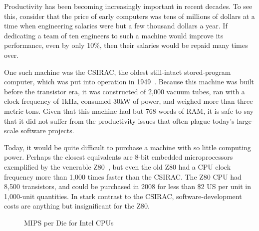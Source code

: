 Productivity has been becoming increasingly important in recent decades.
To see this, consider that the price of early computers was tens
of millions of dollars at
a time when engineering salaries were but a few thousand dollars a year.
If dedicating a team of ten engineers to such a machine would improve
its performance, even by only 10\%, then their salaries
would be repaid many times over.

One such machine was the CSIRAC, the oldest still-intact stored-program
computer, which was put into operation in
1949~\cite{CSIRACMuseumVictoria,CSIRACUniversityMelbourne}.
Because this machine was built before the transistor era, it was constructed
of 2,000 vacuum tubes, ran with a clock frequency of 1kHz,
consumed 30kW of power, and weighed more than three metric tons.
Given that this machine had but 768 words of RAM, it is safe to say that
it did not suffer from the productivity issues that often plague
today's large-scale software projects.

Today, it would be quite difficult to purchase a machine with so
little computing power.
Perhaps the closest equivalents
are 8-bit embedded microprocessors exemplified by the venerable
Z80~\cite{z80Wikipedia}, but even the old Z80 had a CPU clock
frequency more than 1,000 times faster than the CSIRAC.
The Z80 CPU had 8,500 transistors, and could be purchased in 2008
for less than \$2 US per unit in 1,000-unit quantities.
In stark contrast to the CSIRAC, software-development costs are
anything but insignificant for the Z80.

\begin{figure}[tb]
\centering
{}
\caption{MIPS per Die for Intel CPUs}
\label{fig:intro:MIPS per Die for Intel CPUs}
\end{figure}

